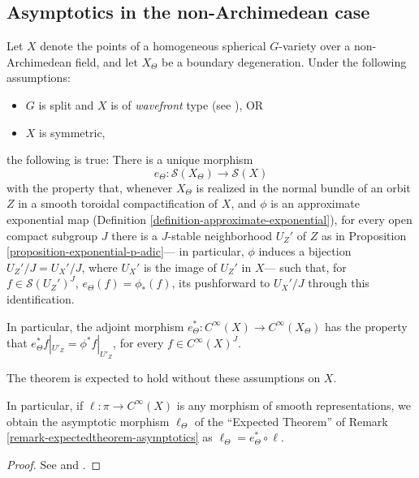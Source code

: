 \subsection{Asymptotics in the non-Archimedean case}
\label{subsection-asymptotics-nonarchimedean}



\begin{theorem}
 \label{theorem-asymptotics-nonarchimedean}
Let $X$ denote the points of a homogeneous spherical $G$-variety over a non-Archimedean field, and let $X_\Theta$ be a boundary degeneration. Under the following assumptions:
\begin{itemize}
 \item $G$ is split and $X$ is of \emph{wavefront} type (see \cite[\S 2.1]{Sakellaridis-Venkatesh}), OR
 \item $X$ is symmetric,
\end{itemize}
the following is true: There is a unique morphism
$$ e_\Theta: \mathcal S(X_\Theta)\to \mathcal S(X)$$
with the property that, whenever $X_\Theta$ is realized in the normal bundle of an orbit $Z$ in a smooth toroidal compactification of $X$, and $\phi$ is an approximate exponential map (Definition \ref{definition-approximate-exponential}), for every open compact subgroup $J$ there is a $J$-stable neighborhood $U_Z'$ of $Z$ as in Proposition \ref{proposition-exponential-p-adic}--- in particular, $\phi$ induces a bijection $U_Z'/J=U_X'/J$, where $U_X'$ is the image of $U_Z'$ in $X$--- such that, for $f\in \mathcal S(U_Z')^J$, $e_\Theta(f) = \phi_*(f)$, its pushforward to $U_X'/J$ through this identification.

In particular, the adjoint morphism $e_\Theta^*: C^\infty(X)\to C^\infty(X_\Theta)$ has the property that $e_\Theta^*f|_{U'_Z} = \phi^* f|_{U'_Z}$, for every $f\in C^\infty(X)^J$. 
\end{theorem}

The theorem is expected to hold without these assumptions on $X$.

In particular, if $\ell:\pi\to C^\infty(X)$ is any morphism of smooth representations, we obtain the asymptotic morphism $\ell_\Theta$ of the ``Expected Theorem'' of Remark \ref{remark-expectedtheorem-asymptotics} as $\ell_\Theta = e_\Theta^*\circ \ell$.

\begin{proof}
 See \cite[Theorem 5.1.1]{Sakellaridis-Venkatesh} and \cite[Theorem 1]{Delorme-Plancherel-padic}. 
\end{proof}





